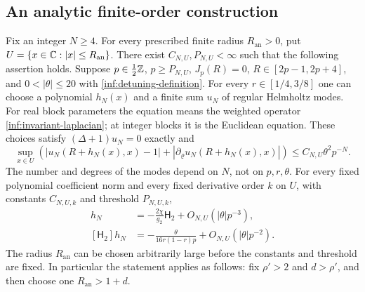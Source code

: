 \subsection{An analytic finite-order construction}

\begin{theorem}\label{inf:centres}
Fix an integer $N\ge4$. For every prescribed finite radius
$R_{\mathrm{an}}>0$, put $U=\{x\in\mathbb{C}:|x|\le R_{\mathrm{an}}\}$.
There exist $C_{N,U},P_{N,U}<\infty$ such that the
following assertion holds. Suppose $p\in\tfrac12\mathbb{Z}$, $p\ge P_{N,U}$,
$J_p(R)=0$, $R\in[2p-1,2p+4]$, and
$0<|\theta|\le20$ with \eqref{inf:detuning-definition}.
For every $r\in[1/4,3/8]$ one can choose a polynomial $h_N(x)$ and
a finite sum $u_N$ of regular Helmholtz modes. For real block
parameters the equation means the weighted operator
\eqref{inf:invariant-laplacian}; at integer blocks it is the
Euclidean equation. These choices satisfy
$(\Delta+1)u_N=0$ exactly and
\begin{equation}\label{inf:centre-complex-defect}
 \sup_{x\in U}\left(|u_N(R+h_N(x),x)-1|
       +|\partial_\varrho u_N(R+h_N(x),x)|\right)
 \le C_{N,U}\theta^2p^{-N}.
\end{equation}
The number and degrees of the modes depend on $N$, not on $p,r,\theta$.
For every fixed polynomial coefficient norm and every fixed derivative
order $k$ on $U$, with constants $C_{N,U,k}$ and threshold
$P_{N,U,k}$,
\begin{align}
 h_N&=-\frac{2\chi}{g_2}\mathsf H_2+O_{N,U}(|\theta|p^{-3}),
 \label{inf:centre-profile}\\
 [\mathsf H_2]h_N&=-\frac{\theta}{16r(1-r)p}
                                  +O_{N,U}(|\theta|p^{-2}).
 \label{inf:centre-witness}
\end{align}
The radius $R_{\mathrm{an}}$ can be chosen arbitrarily large before
the constants and threshold are fixed. In particular the statement
applies as follows: fix $\rho'>2$ and $d>\rho'$, and then
choose one $R_{\mathrm{an}}>1+d$.
\end{theorem}

